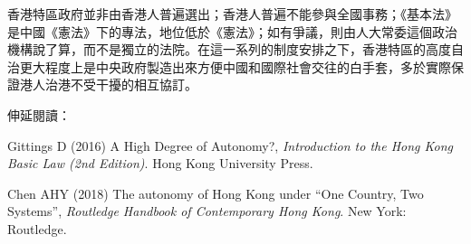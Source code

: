 香港特區政府並非由香港人普遍選出；香港人普遍不能參與全國事務；《基本法》是中國《憲法》下的專法，地位低於《憲法》；如有爭議，則由人大常委這個政治機構說了算，而不是獨立的法院。在這一系列的制度安排之下，香港特區的高度自治更大程度上是中央政府製造出來方便中國和國際社會交往的白手套，多於實際保證港人治港不受干擾的相互協訂。



伸延閱讀：

Gittings D (2016) A High Degree of Autonomy?, \textit{Introduction to the Hong Kong Basic Law (2nd Edition)}. Hong Kong University Press.

Chen AHY (2018) The autonomy of Hong Kong under “One Country, Two Systems”, \textit{Routledge Handbook of Contemporary Hong Kong}. New York: Routledge.